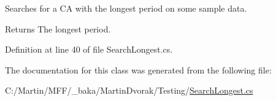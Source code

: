 Searches for a C\+A with the longest period on some sample data. 

\begin{DoxyReturn}{Returns}
The longest period.
\end{DoxyReturn}


Definition at line 40 of file Search\+Longest.\+cs.



The documentation for this class was generated from the following file\+:\begin{DoxyCompactItemize}
\item 
C\+:/\+Martin/\+M\+F\+F/\+\_\+baka/\+Martin\+Dvorak/\+Testing/\hyperlink{_search_longest_8cs}{Search\+Longest.\+cs}\end{DoxyCompactItemize}
